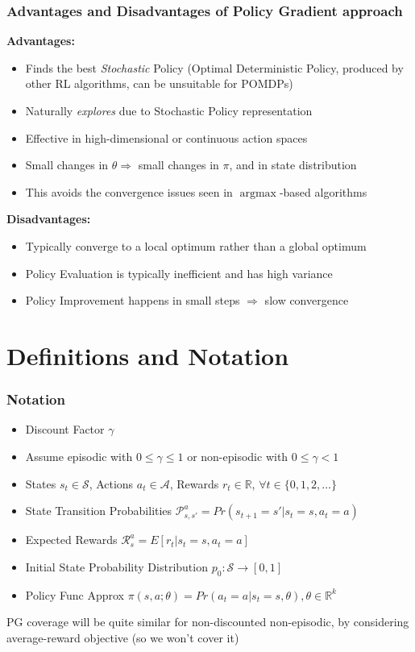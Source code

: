 \documentclass[handout]{beamer}
\DeclareMathOperator*{\argmax}{argmax}
\begin{document}
\begin{frame}
\frametitle{Advantages and Disadvantages of Policy Gradient approach}
\pause
{\bf Advantages:}
\pause
\begin{itemize}[<+->]
\item Finds the best {\em Stochastic} Policy (Optimal Deterministic Policy, produced by other RL algorithms, can be unsuitable for POMDPs)
\item Naturally {\em explores} due to Stochastic Policy representation
\item Effective in high-dimensional or continuous action spaces
\item Small changes in $\theta \Rightarrow$ small changes in $\pi$, and in state distribution
\item This avoids the convergence issues seen in $\argmax$-based algorithms 
\end{itemize}
\pause
{\bf Disadvantages:}
\pause
\begin{itemize}[<+->]
\item Typically converge to a local optimum rather than a global optimum
\item Policy Evaluation is typically inefficient and has high variance
\item Policy Improvement happens in small steps $\Rightarrow$ slow convergence
\end{itemize}
\end{frame}

\section{Definitions and Notation}

\begin{frame}
\frametitle{Notation}
\pause
\begin{itemize}[<+->]
\item Discount Factor $\gamma$
\item Assume episodic with $0 \leq \gamma \leq1$ or non-episodic with $0 \leq \gamma < 1$
\item States $s_t \in \mathcal{S}$, Actions $a_t \in \mathcal{A}$, Rewards $r_t \in \mathbb{R}$, $\forall t \in \{0, 1, 2, \ldots\}$
\item State Transition Probabilities $\mathcal{P}_{s,s'}^a = Pr(s_{t+1}=s'|s_t=s,a_t=a)$
\item Expected Rewards $\mathcal{R}_s^a = E[r_t | s_t=s,a_t=a]$
\item Initial State Probability Distribution $p_0 : \mathcal{S} \rightarrow [0,1]$
\item Policy Func Approx $\pi(s,a;\theta) = Pr(a_t=a | s_t=s,\theta), \theta \in \mathbb{R}^k$
\end{itemize}
\pause
PG coverage will be quite similar for non-discounted non-episodic, by considering average-reward objective (so we won't cover it)
\end{frame}
\end{document}
